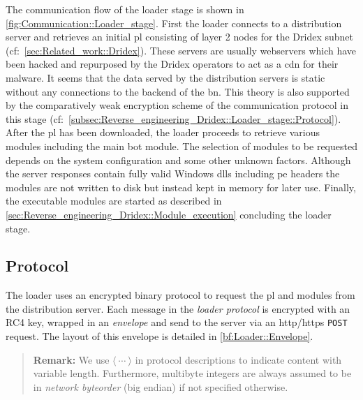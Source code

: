 The communication flow of the loader stage is shown in \autoref{fig:Communication::Loader_stage}.
First the loader connects to a distribution server and retrieves an initial \gls{pl} consisting of layer 2 nodes for the Dridex subnet (cf:~\autoref{sec:Related_work::Dridex}).
These servers are usually webservers which have been hacked and repurposed by the Dridex operators to act as a \gls{cdn} for their malware.
It seems that the data served by the distribution servers is static without any connections to the backend of the \gls{bn}.
This theory is also supported by the comparatively weak encryption scheme of the communication protocol in this stage (cf:~\autoref{subsec:Reverse_engineering_Dridex::Loader_stage::Protocol}).
After the \gls{pl} has been downloaded, the loader proceeds to retrieve various modules including the main \gls{bot} module.
The selection of modules to be requested depends on the system configuration and some other unknown factors.
Although the server responses contain fully valid Windows \glspl{dll} including \gls{pe} headers the modules are not written to disk but instead kept in memory for later use.
Finally, the executable modules are started as described in \autoref{sec:Reverse_engineering_Dridex::Module_execution} concluding the loader stage.

\subsection{Protocol\label{subsec:Reverse_engineering_Dridex::Loader_stage::Protocol}}
The loader uses an encrypted binary protocol to request the \gls{pl} and modules from the distribution server.
Each message in the \emph{loader protocol} is encrypted with an RC4 key, wrapped in an \emph{envelope} and send to the server via an \gls{http}/\gls{https} \lstinline|POST| request.
The layout of this envelope is detailed in \autoref{bf:Loader::Envelope}.

\begin{quote}
\textbf{Remark:} We use \(\langle~\cdots~\rangle\) in protocol descriptions to indicate content with variable length.
Furthermore, multibyte integers are always assumed to be in \emph{network byteorder} (big endian) if not specified otherwise.
\end{quote}

